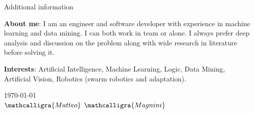 \documentclass{resume} %
\begin{document}
    
    
    \begin{rSection}{Additional information}
        
        \item \textbf{About me}: I am an engineer and software developer with experience in machine learning and data mining. I can both work in team or alone. I always prefer deep analysis and discussion on the problem along with wide research in literature before solving it.
        
        \item \textbf{Interests}: Artificial Intelligence, Machine Learning, Logic, Data Mining, Artificial Vision, Robotics (swarm robotics and adaptation).
        
    \end{rSection}
    
    \vspace{4em}
    \begin{flushright}
        \today
        \\
        \vspace{1em}
        \Large$\mathcalligra{Matteo}$  $\mathcalligra{Magnini}$
        
    \end{flushright}
    
\end{document}
